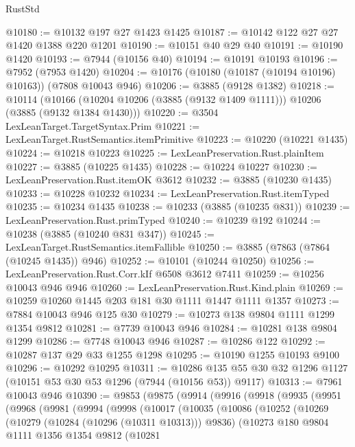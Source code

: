 \begin{lexlean}{RustStd}
\begin{coremodule}
@10180 := @10132 @197 @27 @1423 @1425
@10187 := @10142 @122 @27 @27 @1420 @1388 @220 @1201
@10190 := @10151 @40 @29 @40
@10191 := @10190 @1420
@10193 := @7944 (@10156 @40)
@10194 := @10191 @10193
@10196 := @7952 (@7953 @1420)
@10204 := @10176 (@10180 (@10187 (@10194 @10196) @10163)) (@7808 @10043 @946)
@10206 := @3885 (@9128 @1382)
@10218 := @10114
    (@10166 (@10204 @10206 (@3885 (@9132 @1409 @1111))) @10206 (@3885 (@9132 @1384 @1430)))
@10220 := @3504 LexLeanTarget.TargetSyntax.Prim
@10221 := LexLeanTarget.RustSemantics.itemPrimitive
@10223 := @10220 (@10221 @1435)
@10224 := @10218 @10223
@10225 := LexLeanPreservation.Rust.plainItem
@10227 := @3885 (@10225 @1435)
@10228 := @10224 @10227
@10230 := LexLeanPreservation.Rust.itemOK @3612
@10232 := @3885 (@10230 @1435)
@10233 := @10228 @10232
@10234 := LexLeanPreservation.Rust.itemTyped
@10235 := @10234 @1435
@10238 := @10233 (@3885 (@10235 @831))
@10239 := LexLeanPreservation.Rust.primTyped
@10240 := @10239 @192
@10244 := @10238 (@3885 (@10240 @831 @347))
@10245 := LexLeanTarget.RustSemantics.itemFallible
@10250 := @3885 (@7863 (@7864 (@10245 @1435)) @946)
@10252 := @10101 (@10244 @10250)
@10256 := LexLeanPreservation.Rust.Corr.kIf @6508 @3612 @7411
@10259 := @10256 @10043 @946 @946
@10260 := LexLeanPreservation.Rust.Kind.plain
@10269 := @10259 @10260 @1445 @203 @181 @30 @1111 @1447 @1111 @1357
@10273 := @7884 @10043 @946 @125 @30
@10279 := @10273 @138 @9804 @1111 @1299 @1354 @9812
@10281 := @7739 @10043 @946
@10284 := @10281 @138 @9804 @1299
@10286 := @7748 @10043 @946
@10287 := @10286 @122
@10292 := @10287 @137 @29 @33 @1255 @1298
@10295 := @10190 @1255 @10193 @9100
@10296 := @10292 @10295
@10311 := @10286 @135 @55 @30 @32 @1296 @1127 (@10151 @53 @30 @53 @1296 (@7944 (@10156 @53)) @9117)
@10313 := @7961 @10043 @946
@10390 := @9853
    (@9875
      (@9914
        (@9916
          (@9918
            (@9935
              (@9951
                (@9968
                  (@9981
                    (@9994
                      (@9998
                        (@10017
                          (@10035
                            (@10086
                              (@10252
                                (@10269
                                  (@10279 (@10284 (@10296 (@10311 @10313))) @9836)
                                  (@10273
                                    @180
                                    @9804
                                    @1111
                                    @1356
                                    @1354
                                    @9812
                                    (@10281

\end{coremodule}
\end{lexlean}
